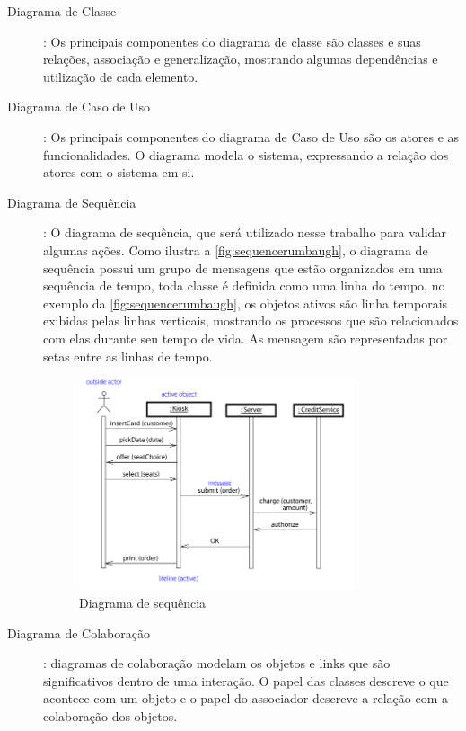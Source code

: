 \begin{description}
    \item[Diagrama de Classe]: Os principais componentes do diagrama de classe são classes e suas relações, associação e generalização, mostrando algumas dependências e utilização de cada elemento.
        
    \item[Diagrama de Caso de Uso]: Os principais componentes do diagrama de Caso de Uso são os atores e as funcionalidades. O diagrama modela o sistema, expressando a relação dos atores com o sistema em si.
 
    
    \item[Diagrama de Sequência]: O diagrama de sequência, que será utilizado nesse trabalho para validar algumas ações. Como ilustra a \autoref{fig:sequencerumbaugh}, o diagrama de sequência possui um grupo de mensagens que estão organizados em uma sequência de tempo, toda classe é definida como uma linha do tempo, no exemplo da \autoref{fig:sequencerumbaugh}, os objetos ativos são linha temporais exibidas pelas linhas verticais, mostrando os processos que são relacionados com elas durante seu tempo de vida. As mensagem são representadas por setas entre as linhas de tempo.
    
        \begin{figure}[H]
    	    \centering
        	\caption{\label{fig:sequencerumbaugh} Diagrama de sequência }
    		\includegraphics[width = 0.8\textwidth]	{diagramas/sequencediagramrumbaugh}
        \end{figure}


    
    \item[Diagrama de Colaboração]: diagramas de colaboração modelam os objetos e links que são significativos dentro de uma interação. O papel das classes descreve o que acontece com um objeto e o papel do associador descreve a relação com a colaboração dos objetos.


\end{description}

